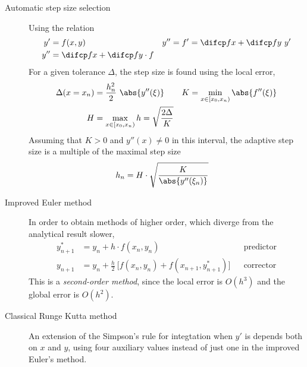 \begin{description}
    \item[Automatic step size selection] Using the relation
        \begin{align}
            y'  & = f(x, y)                        &
            y'' & = f' = \difcp fx + \difcp fy\ y'   \\
            y'' & = \difcp fx + \difcp fy \cdot f
        \end{align}
        For a given tolerance $ \Delta $, the step size is found using the local error,
        \begin{align}
            \Delta(x = x_n) & = \frac{h_n^2}{2}\ \abs{y''(\xi)}        &
            K               & = \min_{x \in [x_0, x_n)} \abs{f''(\xi)}   \\
            H               & = \max_{x \in [x_0, x_n)} h =
            \sqrt{\frac{2\Delta}{K}}
        \end{align}
        Assuming that $ K > 0 $ and $ y''(x) \neq 0 $ in this interval, the adaptive
        step size is a multiple of the maximal step size
        \begin{align}
            h_n & = H \cdot \sqrt{\frac{K}{\abs{y''(\xi_n)}}}
        \end{align}

    \item[Improved Euler method] In order to obtain methods of higher order, which
        diverge from the analytical result slower,
        \begin{align}
            y^*_{n+1}                      & = y_n + h \cdot f(x_n, y_n)             &
                                           & \text{predictor}                          \\
            y_{n+1}                        & = y_n + \frac{h}{2}\ \Bigg[ f(x_n, y_n)
            + f(x_{n+1}, y^*_{n+1}) \Bigg] &                                         &
            \text{corrector}
        \end{align}
        This is a \emph{second-order method}, since the local error is $ O(h^3) $ and
        the global error is $ O(h^2) $.

    \item[Classical Runge Kutta method] An extension of the Simpson's rule for
        integtation when $ y' $ is depends both on $ x $ and $ y $, using four auxiliary
        values instead of just one in the improved Euler's method.


\end{description}
